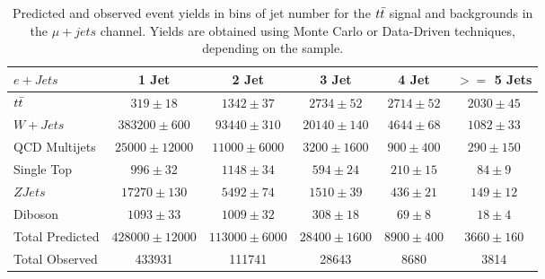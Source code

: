 \begin{table}
  \footnotesize
  \begin{tabular}{lccccc}
    \hline
    $e + Jets$ & 1 Jet & 2 Jet & 3 Jet & 4 Jet & $>=$ 5 Jets \\ 
    \hline
    $t\bar{t}$ & $319 \pm 18$ & $1342 \pm 37$ & $2734 \pm 52$ & $2714 \pm 52$ & $2030 \pm 45$ \\
    $W+Jets$ & $383200 \pm 600$ & $93440 \pm 310$ & $20140 \pm 140$ & $4644 \pm 68$ & $1082 \pm 33$ \\
    QCD Multijets & $25000 \pm 12000$ & $11000 \pm 6000$ & $3200 \pm 1600$ & $900 \pm 400$ & $290 \pm 150$ \\
    Single Top & $996 \pm 32$ & $1148 \pm 34$ & $594 \pm 24$ & $210 \pm 15$ & $84 \pm 9$ \\
    $ZJets$ & $17270 \pm 130$ & $5492 \pm 74$ & $1510 \pm 39$ & $436 \pm 21$ & $149 \pm 12$ \\
    Diboson & $1093 \pm 33$ & $1009 \pm 32$ & $308 \pm 18$ & $69 \pm 8$ & $18 \pm 4$ \\
    \hline
    Total Predicted & $428000 \pm 12000$ & $113000 \pm 6000$ & $28400 \pm 1600$ & $8900 \pm 400$ & $3660 \pm 160$ \\
    Total Observed & 433931 & 111741 & 28643 & 8680 & 3814 \\
    \hline
  \end{tabular}
  \caption{Predicted and observed event yields in bins of jet number for the $t\bar{t}$ signal and backgrounds in the $\mu+jets$ channel.  Yields are obtained using Monte Carlo or Data-Driven techniques, depending on the sample.}
\end{table}


